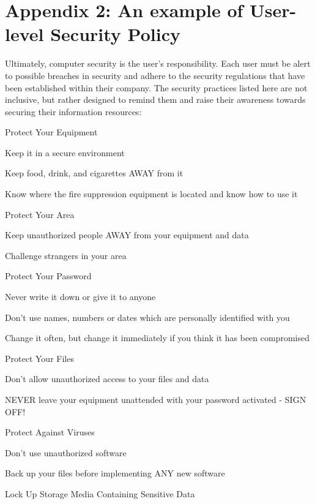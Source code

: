 \chapter{Appendix 2: An example of User-level Security Policy}


Ultimately, computer security is the user's responsibility. Each user
must be alert to possible breaches in security and adhere to the
security regulations that have been established within their company.
The security practices listed here are not inclusive, but rather
designed to remind them and raise their awareness towards securing
their information resources:

\begin{htmllist}

\item[Protect Your Equipment]

Keep it in a secure environment

Keep food, drink, and cigarettes AWAY from it

Know where the fire suppression equipment is located and know how to
use it


\item[Protect Your Area]

Keep unauthorized people AWAY from your equipment and data

Challenge strangers in your area


\item[Protect Your Password]

Never write it down or give it to anyone

Don't use names, numbers or dates which are personally identified with
you

Change it often, but change it immediately if you think it has been
compromised


\item[Protect Your Files]

Don't allow unauthorized access to your files and data

NEVER leave your equipment unattended with your password activated -
SIGN OFF!


\item[Protect Against Viruses]

Don't use unauthorized software

Back up your files before implementing ANY new software


\item[Lock Up Storage Media Containing Sensitive Data]


\end{htmllist}
